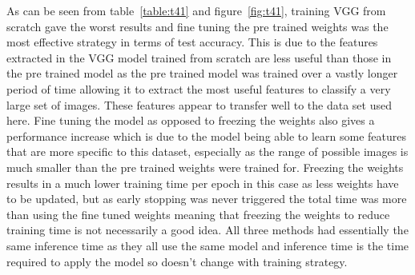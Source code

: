 \documentclass[10pt,twocolumn,letterpaper]{article}
\begin{document}
As can be seen from table~\ref{table:t41} and figure~\ref{fig:t41}, training VGG from scratch gave the worst results and fine tuning the pre trained weights was the most effective strategy in terms of test accuracy. This is due to the features extracted in the VGG model trained from scratch are less useful than those in the pre trained model as the pre trained model was trained over a vastly longer period of time allowing it to extract the most useful features to classify a very large set of images. These features appear to transfer well to the data set used here. Fine tuning the model as opposed to freezing the weights also gives a performance increase which is due to the model being able to learn some features that are more specific to this dataset, especially as the range of possible images is much smaller than the pre trained weights were trained for. Freezing the weights results in a much lower training time per epoch in this case as less weights have to be updated, but as early stopping was never triggered the total time was more than using the fine tuned weights meaning that freezing the weights to reduce training time is not necessarily a good idea. All three methods had essentially the same inference time as they all use the same model and inference time is the time required to apply the model so doesn't change with training strategy. 
\end{document}
